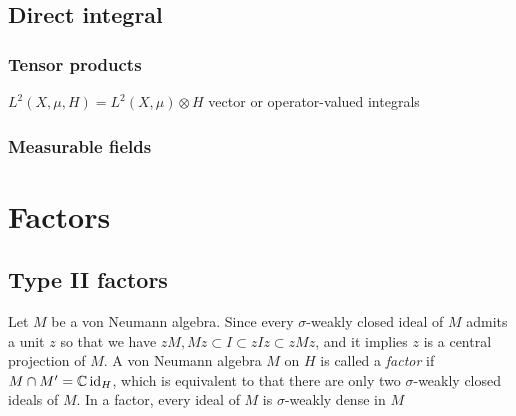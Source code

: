 \documentclass{../../large}
\begin{document}
\chapter{Direct integral}

\section{Tensor products}

$L^2(X,\mu,H)=L^2(X,\mu)\otimes H$
vector or operator-valued integrals

\section{Measurable fields}

\begin{prb}
\end{prb}

\begin{prb}
\end{prb}







\part{Factors}

\chapter{Type II factors}

\begin{prb}
Let $M$ be a von Neumann algebra.
Since every $\sigma$-weakly closed ideal of $M$ admits a unit $z$ so that we have $zM,Mz\subset I\subset zIz\subset zMz$, and it implies $z$ is a central projection of $M$.
A von Neumann algebra $M$ on $H$ is called a \emph{factor} if $M\cap M'=\mathbb{C}\operatorname{id}_H$, which is equivalent to that there are only two $\sigma$-weakly closed ideals of $M$.
In a factor, every ideal of $M$ is $\sigma$-weakly dense in $M$
\end{prb}
\end{document}

